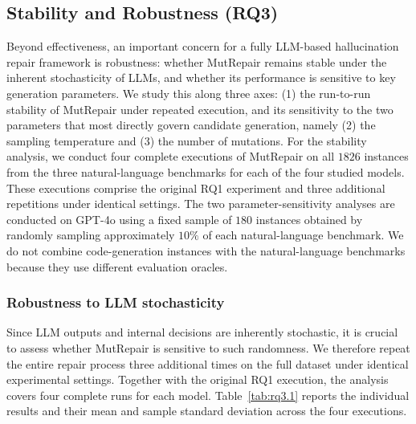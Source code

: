 \documentclass[acmsmall,screen,review,anonymous]{acmart}
\begin{document}
\subsection{Stability and Robustness (RQ3)}

Beyond effectiveness, an important concern for a fully LLM-based hallucination repair framework is robustness: whether MutRepair remains stable under the inherent stochasticity of LLMs, and whether its performance is sensitive to key generation parameters. We study this along three axes: (1) the run-to-run stability of MutRepair under repeated execution, and its sensitivity to the two parameters that most directly govern candidate generation, namely (2) the sampling temperature and (3) the number of mutations. For the stability analysis, we conduct four complete executions of MutRepair on all $1826$ instances from the three natural-language benchmarks for each of the four studied models. These executions comprise the original RQ1 experiment and three additional repetitions under identical settings. The two parameter-sensitivity analyses are conducted on GPT-4o using a fixed sample of $180$ instances obtained by randomly sampling approximately $10\%$ of each natural-language benchmark. We do not combine code-generation instances with the natural-language benchmarks because they use different evaluation oracles.

\subsubsection{Robustness to LLM stochasticity}
Since LLM outputs and internal decisions are inherently stochastic, it is crucial to assess whether MutRepair is sensitive to such randomness. We therefore repeat the entire repair process three additional times on the full dataset under identical experimental settings. Together with the original RQ1 execution, the analysis covers four complete runs for each model. Table~\ref{tab:rq3.1} reports the individual results and their mean and sample standard deviation across the four executions.
\end{document}
